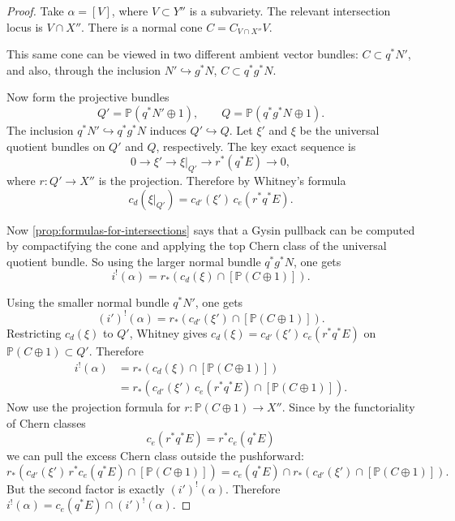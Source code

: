 \documentclass[12pt]{article}
\begin{document}
\begin{proof}
Take $\alpha=[V]$, where $V\subset Y''$ is a subvariety. The relevant intersection locus is $V\cap X''$. There is a normal cone $C=C_{V\cap X''}V$.

This same cone can be viewed in two different ambient vector bundles: $C\subset q^*N'$, and also, through the inclusion $N'\hookrightarrow g^*N$, $C\subset q^*g^*N$.

Now form the projective bundles
$$Q'=\mathbb P(q^*N'\oplus 1), \qquad Q=\mathbb P(q^*g^*N\oplus 1).$$
The inclusion $q^*N'\hookrightarrow q^*g^*N$ induces $Q'\hookrightarrow Q$. Let $\xi'$ and $\xi$ be the universal quotient bundles on $Q'$ and $Q$, respectively. The key exact sequence is
$$0\to \xi'\to \xi|_{Q'}\to r^*(q^*E)\to 0,$$
where $r:Q'\to X''$ is the projection. Therefore by Whitney's formula
$$c_d(\xi|_{Q'}) = c_{d'}(\xi')\,c_e(r^*q^*E).$$

Now \ref{prop:formulas-for-intersections} says that a Gysin pullback can be computed by compactifying the cone and applying the top Chern class of the universal quotient bundle. So using the larger normal bundle $q^*g^*N$, one gets
$$i^!(\alpha) = r_*\left(c_d(\xi)\cap [\mathbb P(C\oplus 1)]\right).$$

Using the smaller normal bundle $q^*N'$, one gets
$$(i')^!(\alpha) = r_*\left(c_{d'}(\xi')\cap [\mathbb P(C\oplus 1)]\right).$$
Restricting $c_d(\xi)$ to $Q'$, Whitney gives
$c_d(\xi) = c_{d'}(\xi')\,c_e(r^*q^*E)$
on $\mathbb P(C\oplus 1)\subset Q'$. Therefore
$$
\begin{aligned}
i^!(\alpha)
&= r_*\left(c_d(\xi)\cap [\mathbb P(C\oplus 1)]\right) \\
&= r_*\left(c_{d'}(\xi')\,c_e(r^*q^*E)\cap [\mathbb P(C\oplus 1)]\right).
\end{aligned}
$$
Now use the projection formula for $r:\mathbb P(C\oplus 1)\to X''$. Since by the functoriality of Chern classes
$$c_e(r^*q^*E)=r^*c_e(q^*E)$$
we can pull the excess Chern class outside the pushforward:
$$
r_*\left(c_{d'}(\xi')\,r^*c_e(q^*E)\cap [\mathbb P(C\oplus 1)]\right)
= c_e(q^*E)\cap r_*\left(c_{d'}(\xi')\cap [\mathbb P(C\oplus 1)]\right).
$$
But the second factor is exactly $(i')^!(\alpha)$. Therefore $i^!(\alpha) = c_e(q^*E)\cap (i')^!(\alpha).$ 
\end{proof}
\end{document}
